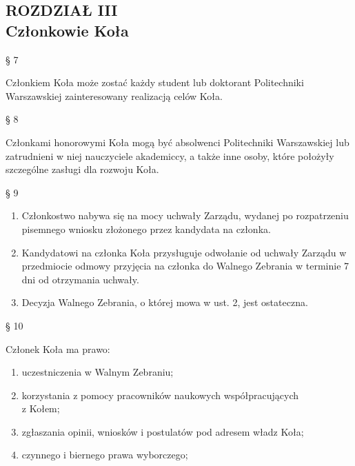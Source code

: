 \documentclass[a4paper,11pt]{article}
\renewcommand{\paragraph}[1] {\begin{center}§ {#1}\end{center}}
\newcommand{\content}[1] {\begin{flushleft}{#1}\end{flushleft}}
\newcommand{\chapter}[2] {\begin{center}\section*{ROZDZIAŁ {#1} \\ {#2}}\end{center}}
\begin{document}
\chapter{III}{Członkowie Koła}

\paragraph{7}
\content{Członkiem  Koła  może  zostać  każdy  student  lub  doktorant  Politechniki  Warszawskiej zainteresowany realizacją celów Koła.}

\paragraph{8}
\content{Członkami honorowymi Koła mogą być absolwenci Politechniki Warszawskiej lub zatrudnieni w
niej nauczyciele akademiccy, a także inne osoby, które położyły szczególne zasługi dla rozwoju Koła.}

\paragraph{9}
\begin{enumerate}
	\item Członkostwo nabywa się na mocy uchwały Zarządu, wydanej po rozpatrzeniu pisemnego wniosku złożonego przez kandydata na członka.
	\item Kandydatowi na członka Koła przysługuje odwołanie od uchwały Zarządu w przedmiocie odmowy przyjęcia na członka do Walnego Zebrania w terminie 7 dni od otrzymania uchwały.
	\item Decyzja Walnego Zebrania, o której mowa w ust. 2, jest ostateczna.
\end{enumerate}

\paragraph{10}
Członek Koła ma prawo:
\begin{enumerate}
	\item uczestniczenia w Walnym Zebraniu;
	\item korzystania z pomocy pracowników naukowych współpracujących \\ z Kołem;
	\item zgłaszania opinii, wniosków i postulatów pod adresem władz Koła;
	\item czynnego i biernego prawa wyborczego;
\end{enumerate}
\end{document}
